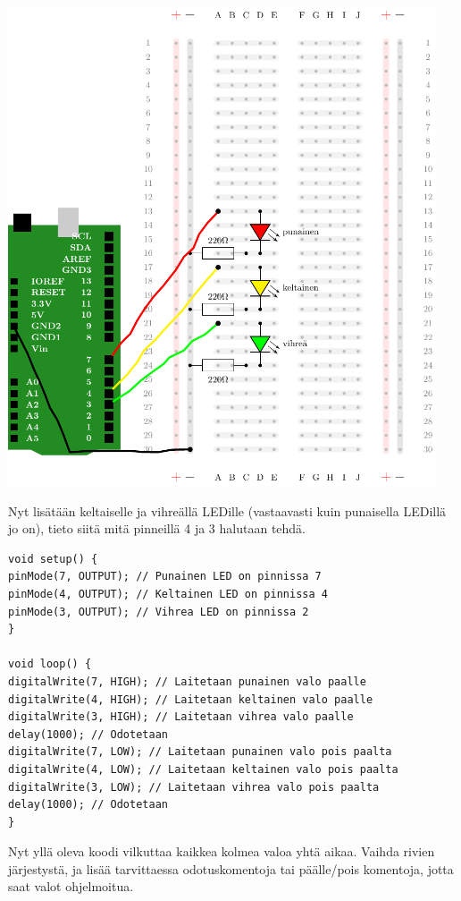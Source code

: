 \includegraphics[width=0.95\textwidth]{kuvat/kuva9.pdf}

Nyt lisätään keltaiselle ja vihreällä LEDille (vastaavasti kuin punaisella LEDillä jo on), tieto siitä mitä pinneillä 4 ja 3 halutaan tehdä.
\clearpage
\begin{lstlisting}[numbers=none] 
void setup() {
pinMode(7, OUTPUT); // Punainen LED on pinnissa 7
pinMode(4, OUTPUT); // Keltainen LED on pinnissa 4
pinMode(3, OUTPUT); // Vihrea LED on pinnissa 2
}

void loop() {
digitalWrite(7, HIGH); // Laitetaan punainen valo paalle
digitalWrite(4, HIGH); // Laitetaan keltainen valo paalle
digitalWrite(3, HIGH); // Laitetaan vihrea valo paalle
delay(1000); // Odotetaan
digitalWrite(7, LOW); // Laitetaan punainen valo pois paalta
digitalWrite(4, LOW); // Laitetaan keltainen valo pois paalta
digitalWrite(3, LOW); // Laitetaan vihrea valo pois paalta
delay(1000); // Odotetaan
}
\end{lstlisting}

Nyt yllä oleva koodi vilkuttaa kaikkea kolmea valoa yhtä aikaa. Vaihda rivien järjestystä, ja lisää tarvittaessa odotuskomentoja tai päälle/pois komentoja, jotta saat valot ohjelmoitua. 

